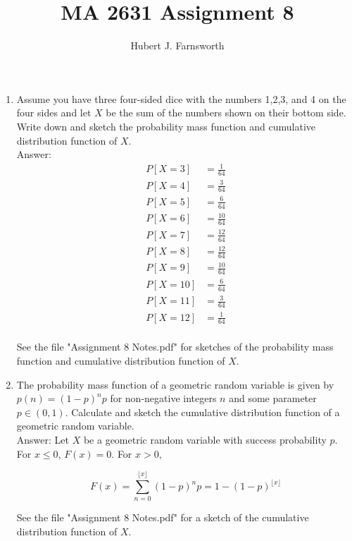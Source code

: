 \documentclass{article}
\title{MA 2631 Assignment 8}
\author{Hubert J. Farnsworth}
\begin{document}
\maketitle

\begin{enumerate}

\item

Assume you have three four-sided dice with the numbers 1,2,3, and 4 on the four sides and let $X$ be the sum of the numbers shown on their bottom side. Write down and sketch the probability mass function and cumulative distribution function of $X$. \\

Answer: 
\begin{align*}
P[X = 3] &= \frac{1}{64} \\
P[X =  4] &= \frac{3}{64} \\
P[X =  5] &= \frac{6}{64}  \\
P[X =  6] &= \frac{10}{64}  \\
P[X =  7] &= \frac{12}{64}  \\
P[X =  8] &= \frac{12}{64}  \\
P[X =  9] &= \frac{10}{64}  \\
P[X =  10] &= \frac{6}{64}  \\
P[X =  11] &= \frac{3}{64}  \\
P[X =  12] &= \frac{1}{64}  \\
\end{align*}

See the file "Assignment 8 Notes.pdf" for sketches of the probability mass function and cumulative distribution function of $X$. 


\item

The probability mass function of a geometric random variable is given by $p(n) = (1-p)^np$ for non-negative integers $n$ and some parameter $p \in (0,1)$. Calculate and sketch the cumulative distribution function of a geometric random variable. \\

Answer: Let $X$ be a geometric random variable with success probability $p$.  For $x \leq 0$, $F(x) = 0$. For $x > 0$,

$$
F(x) = \sum_{n=0}^{\lfloor x \rfloor} (1-p)^np = 1- (1-p)^{\lfloor x \rfloor}
$$

See the file "Assignment 8 Notes.pdf" for a sketch of the cumulative distribution function of $X$. 


\end{enumerate}
\end{document}
